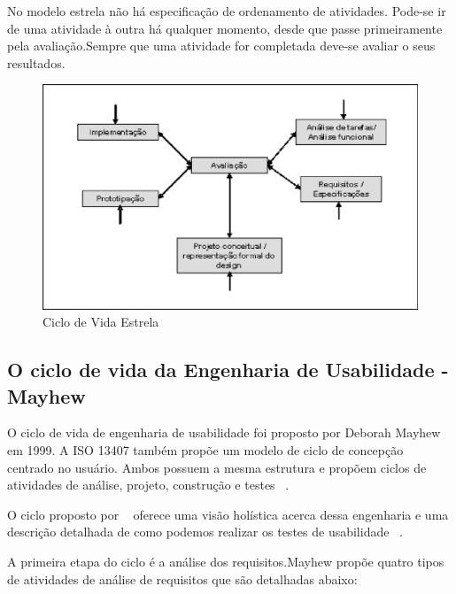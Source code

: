 	No modelo estrela não há especificação de ordenamento de atividades. Pode-se ir de uma atividade à outra há qualquer momento, desde que passe primeiramente pela avaliação.Sempre que uma atividade for completada deve-se avaliar o seus resultados.

\begin{figure}[h]
    \centering
    \includegraphics[keepaspectratio=true,scale=0.60]
      {figuras/estrela.eps}
    \caption{Ciclo de Vida Estrela~\cite{preece2005}}
    \label{ciclo_estrela}
\end{figure}

\subsection{O ciclo de vida da Engenharia de Usabilidade - Mayhew}

	O ciclo de vida de engenharia de usabilidade foi proposto por Deborah Mayhew em 1999. A ISO 13407 também propõe um modelo de ciclo de concepção centrado no usuário. Ambos possuem a mesma estrutura e propõem ciclos de atividades de análise, projeto, construção e testes ~\cite{cybis2010}.

	O ciclo proposto por ~ oferece uma visão holística acerca dessa engenharia e uma descrição detalhada de como podemos realizar os testes de usabilidade ~\cite{preece2005}.

	A primeira etapa do ciclo é a análise dos requisitos.Mayhew propõe quatro tipos de atividades de análise de requisitos que são detalhadas abaixo:

